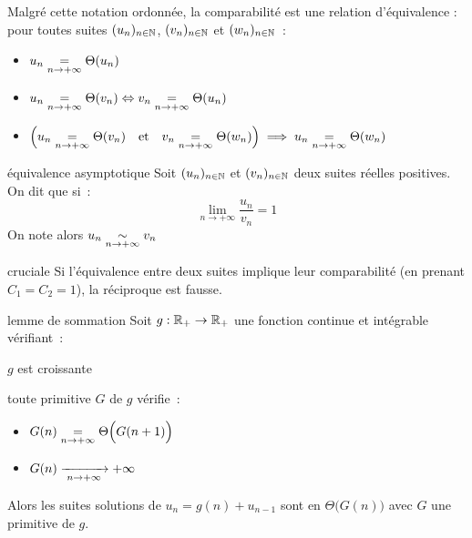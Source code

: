 \begin{remarque}{}{}
    Malgré cette notation ordonnée, la comparabilité est une relation d'équivalence : pour toutes suites $(u_n)_{n \in \mathbb{N}}$, $(v_n)_{n \in \mathbb{N}}$ et $(w_n)_{n \in \mathbb{N}}$~:
    \begin{itemize}
        \item $u_n \underset{n \to + \infty}{\overset{{}}{=}} \Theta(u_n)$
        \item $u_n \underset{n \to + \infty}{\overset{{}}{=}} \Theta(v_n) \Leftrightarrow v_n \underset{n \to + \infty}{\overset{{}}{=}} \Theta(u_n)$
        \item $\Big(u_n \underset{n \to + \infty}{\overset{{}}{=}} \Theta(v_n) \quad \text{et}\quad v_n \underset{n \to + \infty}{\overset{{}}{=}} \Theta(w_n) \Big) \implies u_n \underset{n \to + \infty}{\overset{{}}{=}} \Theta(w_n)$
    \end{itemize}
\end{remarque}

\begin{definition}{}{équivalence asymptotique}
    Soit $(u_n)_{n \in \mathbb{N}}$ et $(v_n)_{n \in \mathbb{N}}$ deux suites réelles positives. On dit que  si~:
    $$\lim_{n\to + \infty} \frac{u_n}{v_n} = 1$$
    On note alors $\displaystyle u_n \underset{n \to + \infty}{\overset{{}}{\sim}} v_n$
\end{definition}

\begin{remarque}{}{cruciale}
    Si l'équivalence entre deux suites implique leur comparabilité (en prenant $C_1 = C_2 = 1$), la réciproque est fausse.

\end{remarque}

\begin{theoreme}{}{lemme de sommation}
    Soit $g : \mathbb{R}_+ \to \mathbb{R}_+$ une fonction continue et intégrable vérifiant~:
    \begin{enumeratebf}
        \item $g$ est croissante
        \item toute primitive $G$ de $g$ vérifie~:
        \begin{itemize}
            \item  $G(n) \underset{n \to + \infty}{\overset{{}}{=}} \Theta\Big(G(n+1)\Big)$
            \item $G(n) \xrightarrow[\;n \to + \infty\;]{} +\infty$
        \end{itemize}
    \end{enumeratebf}
    Alors les suites solutions de $u_n = g(n) + u_{n-1}$ sont en $\Theta\Big(G(n)\Big)$ avec $G$ une primitive de $g$.
\end{theoreme}

